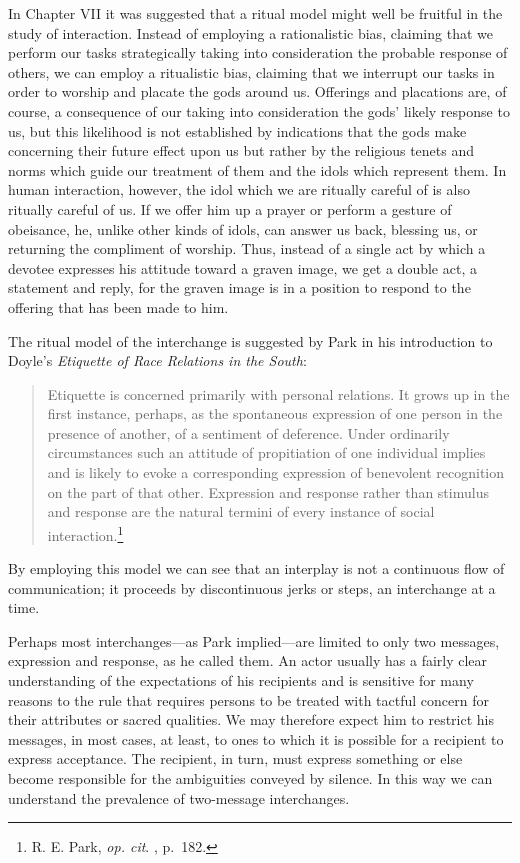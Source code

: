 \documentclass[openany,nobib]{tufte-book}
\begin{document}
In Chapter VII it was suggested that a ritual model might well be
fruitful in the study of interaction. Instead of employing a
rationalistic bias, claiming that we perform our tasks strategically
taking into consideration the probable response of others, we can employ
a ritualistic bias, claiming that we interrupt our tasks in order to
worship and placate the gods around us. Offerings and placations are, of
course, a consequence of our taking into consideration the gods' likely
response to us, but this likelihood is not established by indications
that the gods make concerning their future effect upon us but rather by
the religious tenets and norms which guide our treatment of them and the
idols which represent them. In human interaction, however, the idol
which we are ritually careful of is also ritually careful of us. If we
offer him up a prayer or perform a gesture of obeisance, he, unlike
other kinds of idols, can answer us back, blessing us, or returning the
compliment of worship. Thus, instead of a single act by which a devotee
expresses his attitude toward a graven image, we get a double act, a
statement and reply, for the graven image is in a position to respond to
the offering that has been made to him.

The ritual model of the interchange is suggested by Park in his
introduction to Doyle's \emph{Etiquette of Race Relations in the South}:

\begin{quote}
Etiquette is concerned primarily with personal relations. It grows up in
the first instance, perhaps, as the spontaneous expression of one person
in the presence of another, of a sentiment of deference. Under
ordinarily circumstances such an attitude of propitiation of one
individual implies and is likely to evoke a corresponding expression of
benevolent recognition on the part of that other. Expression and
response rather than stimulus and response are the natural termini of
every instance of social interaction.\footnote{R. E. Park, \emph{op.
  cit}. , p.~182.}
\end{quote}

\newpage\noindent By employing this model we can see that an interplay is not a continuous
flow of communication; it proceeds by discontinuous jerks or steps, an
interchange at a time.

Perhaps most interchanges---as Park implied---are limited to only two
messages, expression and response, as he called them. An actor usually
has a fairly clear understanding of the expectations of his recipients
and is sensitive for many reasons to the rule that requires persons to
be treated with tactful concern for their attributes or sacred
qualities. We may therefore expect him to restrict his messages, in most
cases, at least, to ones to which it is possible for a recipient to
express acceptance. The recipient, in turn, must express something or
else become responsible for the ambiguities conveyed by silence. In this
way we can understand the prevalence of two-message interchanges.
\end{document}
